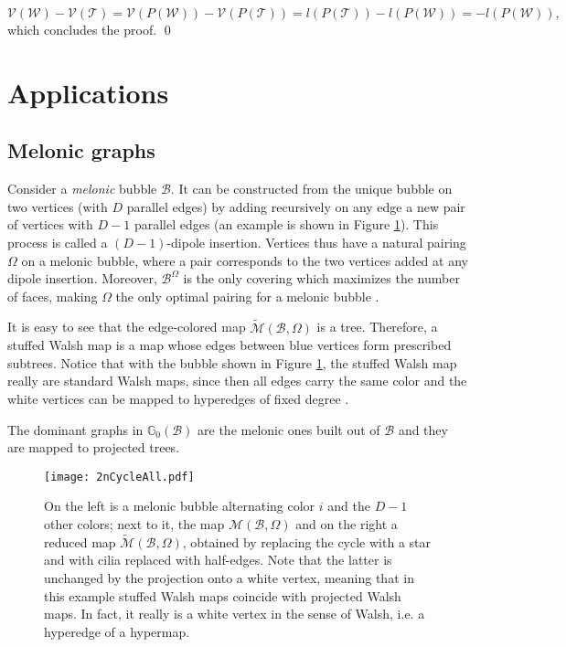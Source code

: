\documentclass[aps,prd,10pt,notitlepage,nofootinbib,superscriptaddress,showkeys,showpacs]{revtex4-1}
\begin{document}
\begin{equation}
{\mathcal{V}}({\mathcal{W}}) - {\mathcal{V}}({\mathcal{T}}) = {\mathcal{V}}(P({\mathcal{W}})) - {\mathcal{V}}(P({\mathcal{T}})) = l(P({\mathcal{T}})) - l(P({\mathcal{W}})) = - l(P({\mathcal{W}})),
\end{equation}
which concludes the proof.
\qed

\section{Applications} \label{sec:Applications}

\subsection{Melonic graphs}

Consider a \emph{melonic} bubble ${\mathcal{B}}$. It can be constructed from the unique bubble on two vertices (with $D$ parallel edges) by adding recursively on any edge a new pair of vertices with $D-1$ parallel edges (an example is shown in Figure \ref{fig:MonoColMel}). This process is called a $(D-1)$-dipole insertion. Vertices thus have a natural pairing $\Omega$ on a melonic bubble, where a pair corresponds to the two vertices added at any dipole insertion. Moreover, ${\mathcal{B}}^\Omega$ is the only covering which maximizes the number of faces, making $\Omega$  the only optimal pairing for a melonic bubble \cite{Universality}.

It is easy to see that the edge-colored map $\tilde{\mathcal{M}}({\mathcal{B}}, \Omega)$ is a tree. Therefore, a stuffed Walsh map is a map whose edges between blue vertices form prescribed subtrees. Notice that with the bubble shown in Figure \ref{fig:MonoColMel}, the stuffed Walsh map really are standard Walsh maps, since then all edges carry the same color and the white vertices can be mapped to hyperedges of fixed degree \cite{Walsh}.

The dominant graphs in ${\mathbb{G}}_0({\mathcal{B}})$ are the melonic ones built out of ${\mathcal{B}}$ and they are mapped to projected trees.

\begin{figure}
\texttt{[image: 2nCycleAll.pdf]} 
\caption{\label{fig:MonoColMel} On the left is a melonic bubble alternating color $i$ and the $D-1$ other colors; next to it, the map ${\mathcal{M}}({\mathcal{B}}, \Omega)$ and on the right a reduced map $\tilde{\mathcal{M}}({\mathcal{B}}, \Omega)$, obtained by replacing the cycle with a star and with cilia replaced with half-edges. Note that the latter is unchanged by the projection onto a white vertex, meaning that in this example stuffed Walsh maps coincide with projected Walsh maps. In fact, it really is a white vertex in the sense of Walsh, i.e. a hyperedge of a hypermap.}
\end{figure}
\end{document}
